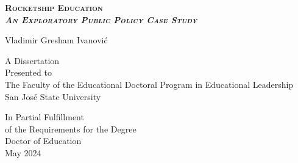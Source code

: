
\pagestyle{empty}               %

\begin{center}
\Large

\textsc{\LARGE\textbf{%
Rocketship Education\\\bigskip
\textnormal{\textit{An Exploratory Public Policy Case Study}}}}\\
\bigskip

Vladimir Gresham Ivanović\\
\vspace{4\baselineskip}

A Dissertation\\
Presented to\\
The Faculty of the Educational Doctoral Program in Educational Leadership\\
San José State University\\
\vspace{3\baselineskip}

In Partial Fulfillment\\
of the Requirements for the Degree\\
Doctor of Education\\
\vspace{3\baselineskip}
May 2024\\

\normalfont
\end{center}

\thispagestyle{empty}

